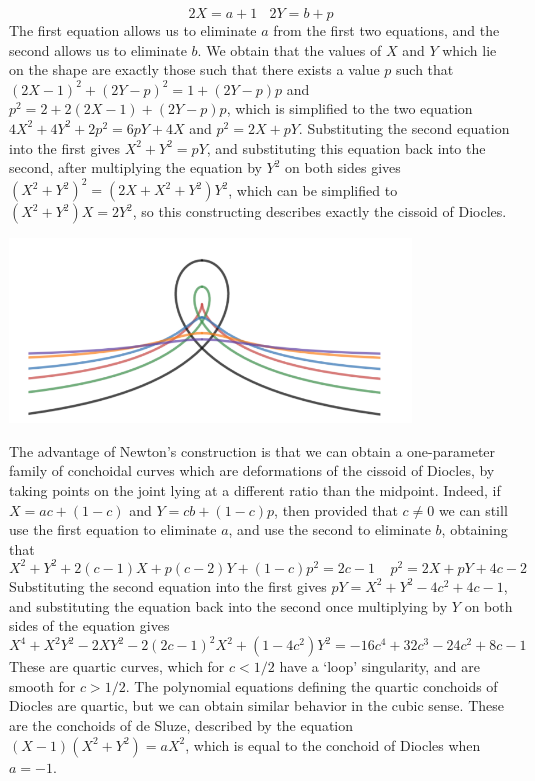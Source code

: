 \begin{example}
    \[ 2X = a + 1\ \ \ \ 2Y = b + p \]
    The first equation allows us to eliminate $a$ from the first two equations, and the second allows us to eliminate $b$. We obtain that the values of $X$ and $Y$ which lie on the shape are exactly those such that there exists a value $p$ such that $(2X - 1)^2 + (2Y - p)^2 = 1 + (2Y - p)p$ and $p^2 = 2 + 2(2X - 1) + (2Y - p)p$, which is simplified to the two equation $4X^2 + 4Y^2 + 2p^2 = 6pY + 4X$ and $p^2 = 2X + pY$. Substituting the second equation into the first gives $X^2 + Y^2 = pY$, and substituting this equation back into the second, after multiplying the equation by $Y^2$ on both sides gives $(X^2 + Y^2)^2 = (2X + X^2 + Y^2)Y^2$, which can be simplified to $(X^2 + Y^2)X = 2Y^2$, so this constructing describes exactly the cissoid of Diocles.
    \begin{center}
        \includegraphics[width=0.8\textwidth]{ConchoidDiocles2}
    \end{center}
    The advantage of Newton's construction is that we can obtain a one-parameter family of conchoidal curves which are deformations of the cissoid of Diocles, by taking points on the joint lying at a different ratio than the midpoint. Indeed, if $X = ac + (1 - c)$ and $Y = cb + (1-c)p$, then provided that $c \neq 0$ we can still use the first equation to eliminate $a$, and use the second to  eliminate $b$, obtaining that
    \[ X^2 + Y^2 + 2(c-1)X + p(c-2)Y + (1 - c)p^2 = 2c - 1\ \ \ \ \  p^2 = 2X + pY + 4c - 2 \]
    Substituting the second equation into the first gives $pY = X^2 + Y^2 - 4c^2 + 4c - 1$, and substituting the equation back into the second once multiplying by $Y$ on both sides of the equation gives
    \[ X^4 + X^2Y^2  - 2XY^2 - 2(2c-1)^2X^2 + (1 - 4c^2)Y^2 = -16c^4 + 32c^3 - 24c^2 + 8c - 1 \]
    These are quartic curves, which for $c < 1/2$ have a `loop' singularity, and are smooth for $c > 1/2$. The polynomial equations defining the quartic conchoids of Diocles are quartic, but we can obtain similar behavior in the cubic sense. These are the conchoids of de Sluze, described by the equation $(X-1)(X^2 + Y^2) = aX^2$, which is equal to the conchoid of Diocles when $a = -1$.

\end{example}
